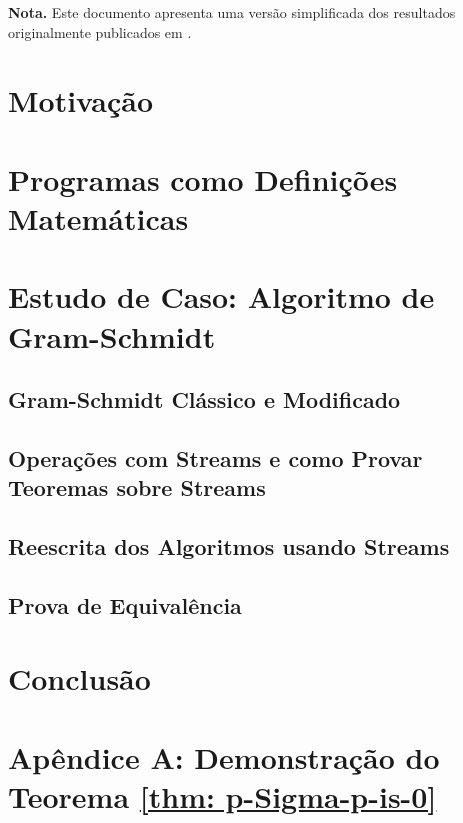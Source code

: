 \documentclass[twocolumn, 10pt]{article}
\begin{document}
  \maketitle

  \noindent\textbf{Nota.} Este documento apresenta uma versão simplificada dos resultados originalmente publicados em \cite{Pereira2026}.

  \section{Motivação}
  

  \section{Programas como Definições Matemáticas}
  

  \section{Estudo de Caso: Algoritmo de Gram-Schmidt}
    \subsection{Gram-Schmidt Clássico e Modificado}
    

    \subsection{Operações com Streams e como Provar Teoremas sobre Streams}
    

    \subsection{Reescrita dos Algoritmos usando Streams}
    

    \subsection{Prova de Equivalência}
    

  \section*{Conclusão}
  

  \printbibliography

  \appendix

  \section*{Apêndice A: Demonstração do Teorema \ref{thm: p-Sigma-p-is-0}}
  
\end{document}
